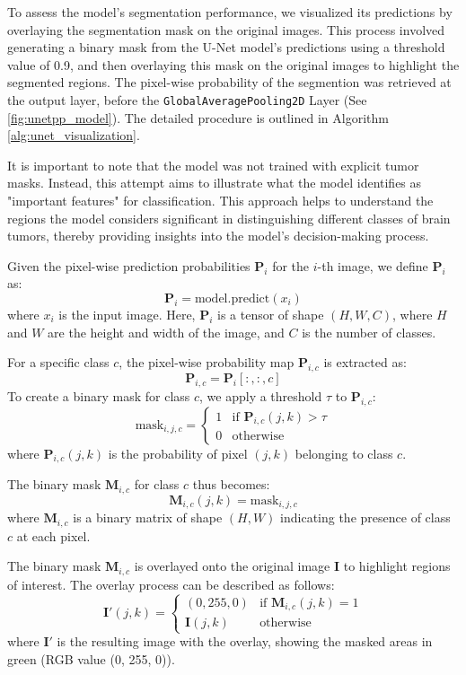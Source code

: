 To assess the model's segmentation performance, we visualized its predictions by overlaying the segmentation mask on the original images. This process involved generating a binary mask from the U-Net model's predictions using a threshold value of 0.9, and then overlaying this mask on the original images to highlight the segmented regions. The pixel-wise probability of the segmention was retrieved at the output layer, before the \texttt{GlobalAveragePooling2D} Layer (See \ref{fig:unetpp_model}). The detailed procedure is outlined in Algorithm \ref{alg:unet_visualization}.

It is important to note that the model was not trained with explicit tumor masks. Instead, this attempt aims to illustrate what the model identifies as "important features" for classification. This approach helps to understand the regions the model considers significant in distinguishing different classes of brain tumors, thereby providing insights into the model's decision-making process.

Given the pixel-wise prediction probabilities $\mathbf{P}_i$ for the $i$-th image, we define $\mathbf{P}_i$ as:
\[
\mathbf{P}_i = \text{model.predict}(x_i)
\]
where $x_i$ is the input image. Here, $\mathbf{P}_i$ is a tensor of shape $(H, W, C)$, where $H$ and $W$ are the height and width of the image, and $C$ is the number of classes.

For a specific class $c$, the pixel-wise probability map $\mathbf{P}_{i,c}$ is extracted as:
\[
\mathbf{P}_{i,c} = \mathbf{P}_i[:, :, c]
\]
To create a binary mask for class $c$, we apply a threshold $\tau$ to $\mathbf{P}_{i,c}$:
\[
\text{mask}_{i,j,c} = 
\begin{cases} 
1 & \text{if } \mathbf{P}_{i,c}(j,k) > \tau \\
0 & \text{otherwise}
\end{cases}
\]
where $\mathbf{P}_{i,c}(j,k)$ is the probability of pixel $(j,k)$ belonging to class $c$.

The binary mask $\mathbf{M}_{i,c}$ for class $c$ thus becomes:
\[
\mathbf{M}_{i,c}(j,k) = \text{mask}_{i,j,c}
\]
where $\mathbf{M}_{i,c}$ is a binary matrix of shape $(H, W)$ indicating the presence of class $c$ at each pixel.

The binary mask $\mathbf{M}_{i,c}$ is overlayed onto the original image $\mathbf{I}$ to highlight regions of interest. The overlay process can be described as follows:
\[
\mathbf{I}'(j,k) = 
\begin{cases} 
(0, 255, 0) & \text{if } \mathbf{M}_{i,c}(j,k) = 1 \\
\mathbf{I}(j,k) & \text{otherwise}
\end{cases}
\]
where $\mathbf{I}'$ is the resulting image with the overlay, showing the masked areas in green (RGB value (0, 255, 0)).

